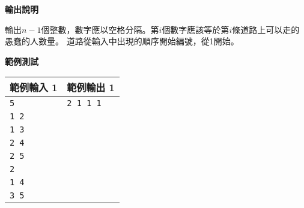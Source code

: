     \textbf{輸出說明}

    輸出$n-1$個整數，數字應以空格分隔。第$i$個數字應該等於第$i$條道路上可以走的愚蠢的人數量。
    道路從輸入中出現的順序開始編號，從1開始。

    \textbf{範例測試}

    \begin{tabular}{|m{7cm}|m{7cm}|}
        \hline
        範例輸入 1 & 範例輸出 1 \\
        \hline
        \verb|5|  & \verb|2 1 1 1| \\
        \verb|1 2|  & \\
        \verb|1 3|  & \\
        \verb|2 4|  & \\
        \verb|2 5|  & \\
        \verb|2| & \\
        \verb|1 4|  & \\
        \verb|3 5|  & \\
        \hline
    \end{tabular}
